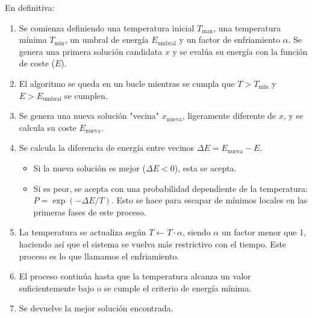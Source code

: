 \documentclass[11pt,a4paper]{book}
\begin{document}
En definitiva:
\begin{enumerate}
    \item Se comienza definiendo una temperatura inicial $T_{\text{max}}$, una temperatura mínima $T_{\text{min}}$, un umbral de energía $E_{\text{umbral}}$ y un factor de enfriamiento $\alpha$. Se genera una primera solución candidata $x$ y se evalúa su energía con la función de coste ($E$).
    
    \item El algoritmo se queda en un bucle mientras se cumpla que $T > T_{\text{min}}$ y $E > E_{\text{umbral}}$ se cumplen. 
    
    \item Se genera una nueva solución "vecina" $x_{\text{nueva}}$, ligeramente diferente de $x$, y se calcula su coste $E_{\text{nueva}}$.
    
    \item Se calcula la diferencia de energía entre vecinos $\Delta E = E_{\text{nueva}} - E$.
    \begin{itemize}
        \item Si la nueva solución es mejor ($\Delta E < 0$), esta se acepta.
        \item Si es peor, se acepta con una probabilidad dependiente de la temperatura: $P = \exp(-\Delta E / T)$. Esto se hace para escapar de mínimos locales en las primeras fases de este proceso.
    \end{itemize}
    
    \item La temperatura se actualiza según $T \leftarrow T \cdot \alpha$, siendo $\alpha$ un factor menor que 1, haciendo así que el sistema se vuelva más restrictivo con el tiempo. Este proceso es lo que llamamos el enfriamiento.
    
    \item El proceso continúa hasta que la temperatura alcanza un valor suficientemente bajo o se cumple el criterio de energía mínima. 
    \item Se devuelve la mejor solución encontrada.
\end{enumerate}
\end{document}
